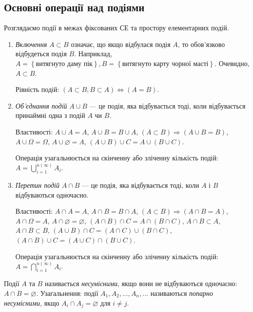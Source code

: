 \subsection{Основні операції над подіями}
\begin{remark}
    Розглядаємо події в межах фіксованих СЕ та простору елементарних подій.
\end{remark}
\begin{enumerate}
    \item \emph{Включення} $A \subset B$ означає, що якщо відбулася подія $A$, то обов'язково відбудеться подія $B$.
    Наприклад, $A = \left\{\text{витягнуто даму пік}\right\}, B = \left\{\text{витягнуто карту чорної масті}\right\}$. 
    Очевидно, $A\subset B$.

    Рівність подій: $\left( A \subset B, B \subset A \right) \iff \left( A = B\right)$.
    \item \emph{Об'єднання подій} $A \cup B$ --- це подія, яка відбувається тоді, коли відбувається
    принаймні одна з подій $A$ чи $B$.

    Властивості: $A \cup A = A$,  $A \cup B = B \cup A$, $\left( A \subset B \right) \Rightarrow \left( A \cup B = B \right)$, 
    $A \cup \Omega = \Omega$, $A \cup \varnothing = A$, $\left( A \cup B \right) \cup C = A \cup \left( B \cup C \right)$.

    Операція узагальнюється на скінченну або зліченну кількість подій: $A = \bigcup_{i=1}^{n \left( \infty \right)} A_i$.
    \item \emph{Перетин подій} $A \cap B$ --- це подія, яка відбувається тоді, коли $A$ і $B$ відбуваються одночасно.

    Властивості: $A \cap A = A$,  $A \cap B = B \cap A$, $\left( A \subset B \right) \Rightarrow \left( A \cap B = A \right)$, 
    $A \cap \Omega = A$, $A \cap \varnothing = \varnothing$, $\left( A \cap B \right) \cap C = A \cap \left( B \cap C \right)$,
    $A \cap B \subset A$, $A \cap B \subset B$, $\left( A \cup B \right) \cap C = \left( A \cap C \right) \cup \left( B \cap C \right)$,
    $\left( A \cap B \right) \cup C = \left( A \cup C \right) \cap \left( B \cup C \right)$.

    Операція узагальнюється на скінченну або зліченну кількість подій: $A = \bigcap_{i=1}^{n \left( \infty \right)} A_i$.
\end{enumerate}
\begin{definition}
    Події $A$ та $B$ називається \emph{несумісними}, якщо вони не відбуваються одночасно: $A \cap B = \varnothing$.
    Узагальнення: події $A_1, A_2, ..., A_n, ...$ називаються \emph{попарно несумісними}, якщо $A_i \cap A_j = \varnothing$ для $i \neq j$.
\end{definition}
